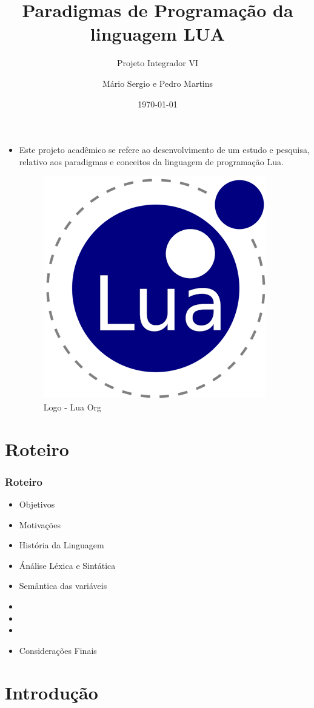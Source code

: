 \documentclass{beamer}
\title{Paradigmas de Programação da linguagem LUA}
\subtitle{Projeto Integrador VI}
\author{Mário Sergio e Pedro Martins}
\date{\today}
\begin{document}
\frame{\titlepage}


\begin{frame}[fragile]
	\begin{itemize}
	\frametitle{Paradigmas de Programação da linguagem LUA}
		\item Este projeto acadêmico se refere ao desenvolvimento de um estudo e pesquisa, relativo aos paradigmas e conceitos da linguagem de programação Lua.
			\begin{figure}[H]
			\centering
			\includegraphics[width=0.3\linewidth]{imagens/logo}
			\caption{Logo - Lua Org}
			\end{figure}
	\end{itemize}
\end{frame}

\section{Roteiro}
\begin{frame}[fragile]
	\frametitle{Roteiro}
	\begin{itemize}
		\item Objetivos
		\item Motivações
		\item História da Linguagem
		\item Ánálise Léxica e Sintática
		\item Semântica das variáveis
		\item 
		\item 
		\item 
		\item Considerações Finais
	\end{itemize}
\end{frame}

\section{Introdução}
\end{document}
